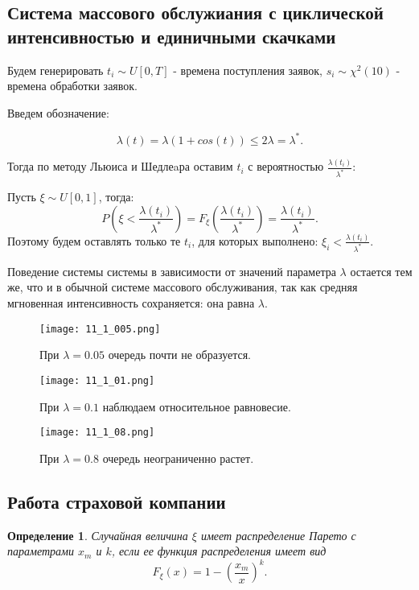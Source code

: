 \documentclass[a4paper, 11pt]{article}
\theoremstyle{def}
\newtheorem{definition}{Определение}[section]
\theoremstyle{th}
\theoremstyle{rem}
\begin{document}
\subsection{Система массового обслужиания с циклической интенсивностью и единичными скачками}

Будем генерировать $t_i \sim U[0, T]$ - времена поступления заявок, $s_i \sim \chi^2(10)$ - времена обработки заявок.

Введем обозначение:

$$\lambda(t) = \lambda(1 + cos(t)) \leqslant 2\lambda = \lambda^*.$$

Тогда по методу Льюиса и Шедлеaра оставим $t_i$ с вероятностью $\displaystyle\frac{\lambda(t_i)}{\lambda^*}$:

Пусть $\xi \sim U[0, 1]$, тогда: $$ P\left(\xi < \displaystyle\frac{\lambda(t_i)}{\lambda^*}\right) = F_{\xi}\left(\displaystyle\frac{\lambda(t_i)}{\lambda^*}\right) = \displaystyle\frac{\lambda(t_i)}{\lambda^*}.$$ Поэтому будем оставлять только те $t_i$, для которых выполнено: $\xi_i < \displaystyle\frac{\lambda(t_i)}{\lambda^*}.$

Поведение системы системы в зависимости от значений параметра $\lambda$ остается тем же, что и в обычной системе массового обслуживания, так как средняя мгновенная интенсивность сохраняется: она равна $\lambda$.

\begin{figure}[H]
\noindent
        \centering
        {
        \texttt{[image: 11\_1\_005.png]}}
        \caption{При $\lambda = 0.05$ очередь почти не образуется.}
\end{figure}

\begin{figure}[H]
\noindent
        \centering
        {
        \texttt{[image: 11\_1\_01.png]}}
        \caption{При $\lambda = 0.1$ наблюдаем относительное равновесие.}
\end{figure}

\begin{figure}[H]
\noindent
        \centering
        {
        \texttt{[image: 11\_1\_08.png]}}
        \caption{При $\lambda = 0.8$ очередь неограниченно растет.}
\end{figure}

\subsection{Работа страховой компании}

\begin{definition}
        Случайная величина $\xi$ имеет \textit{распределение Парето} с параметрами $x_m$ и $k$, если ее функция распределения имеет вид
$$
        F_{\xi}(x) = 1 - \left(\frac{x_m}{x}\right)^k.
$$
\end{definition}
\end{document}
